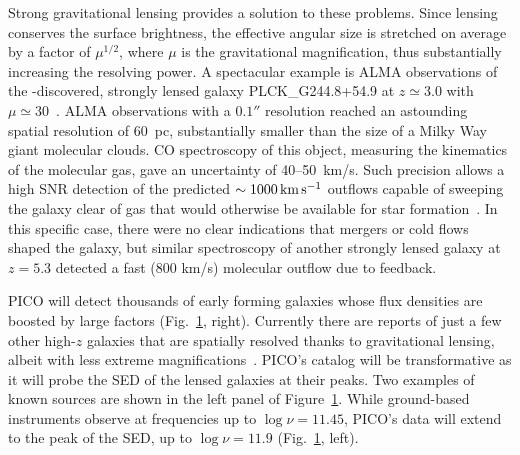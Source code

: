 \documentclass[PICOReport.tex]{subfiles}
\begin{document}
\begin{figure}[h]
\begin{center}
\label{fig:SED3}
\end{center}
\vspace{-0.15in}
\end{figure}

Strong gravitational lensing provides a solution to these problems. Since lensing conserves the surface brightness, the effective angular size is stretched on average by a factor of $\mu^{1/2}$, where $\mu$ is the gravitational magnification, thus substantially increasing the resolving power. A spectacular example is ALMA observations of the \planck-discovered, strongly lensed galaxy PLCK\_G244.8\-+54.9 at $z \simeq 3.0$  with $\mu \simeq 30$~\citep{Canameras2017ALMA}. ALMA observations with a $0.1''$ resolution reached an astounding spatial resolution of 60~pc, substantially smaller than the size of a Milky Way giant molecular clouds. CO spectroscopy of this object, measuring the kinematics of the molecular gas, gave an uncertainty of 40--50~km/s. Such precision allows a high \ac{SNR} detection of the predicted $\sim 1000\,\hbox{km}\,\hbox{s}^{-1}$  outflows capable of sweeping the galaxy clear of gas that would otherwise be available for star formation~\citep{KingPounds2015}. In this specific case, there were no clear indications that mergers or cold flows shaped the galaxy, but similar spectroscopy of another strongly lensed galaxy at $z=5.3$ detected a fast (800 km/s) molecular outflow due to feedback. 

PICO will detect thousands of early forming galaxies whose flux densities are boosted by large factors (Fig.~\ref{fig:SED3}, right).
Currently there are reports of just a few other high-$z$ galaxies that are spatially resolved thanks to gravitational lensing, albeit with less extreme magnifications~\citep{Dye2018, Lamarche2018, Sharda2018}. PICO's catalog will be transformative as it will probe the \ac{SED} of the lensed galaxies at their peaks. Two examples of known sources are shown in the left panel of Figure~\ref{fig:SED3}. While ground-based instruments observe at frequencies up to $\log \nu = 11.45$, PICO's data will extend to the peak of the \ac{SED}, up to $\log \nu = 11.9$ (Fig.~\ref{fig:SED3}, left).
\end{document}
